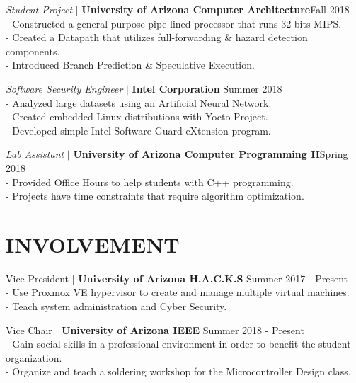 \documentclass[line, 12pt]{res}
\newcommand\tab[1][0.5cm]{\hspace*{#1}}
\begin{document}
\begin{resume}
				{\sl Student Project} $\mid$ \textbf{University of Arizona Computer Architecture}\hfill Fall 2018 \\
				\tab - Constructed a general purpose pipe-lined processor that runs 32 bits MIPS. \\
				\tab - Created a Datapath that utilizes full-forwarding \& hazard detection components. \\
				\tab - Introduced Branch Prediction \& Speculative Execution. 
				
				{\sl Software Security Engineer} $\mid$ \textbf{Intel Corporation} \hfill Summer 2018 \\
                \tab - Analyzed large datasets using an Artificial Neural Network. \\
                \tab - Created embedded Linux distributions with Yocto Project.\\
                \tab - Developed simple Intel Software Guard eXtension program.
 		
 
                {\sl Lab Assistant} $\mid$ \textbf{University of Arizona Computer Programming II}\hfill Spring 2018 \\
                 	\tab - Provided Office Hours to help students with C++ programming. \\
                 	\tab - Projects have time constraints that require algorithm optimization.
				
				
				

\section{INVOLVEMENT} 
	Vice President $\mid$ \textbf{University of Arizona H.A.C.K.S} \hfill Summer 2017 - Present \\
	\tab - Use Proxmox VE hypervisor to create and manage multiple virtual machines. \\
	\tab - Teach system administration and Cyber Security.

	Vice Chair $\mid$ \textbf{University of Arizona IEEE} \hfill Summer 2018 - Present \\
		\tab - Gain social skills in a professional environment in order to benefit the student organization. \\
		\tab - Organize and teach a soldering workshop for the Microcontroller Design class.
	


\end{resume}
\end{document}
